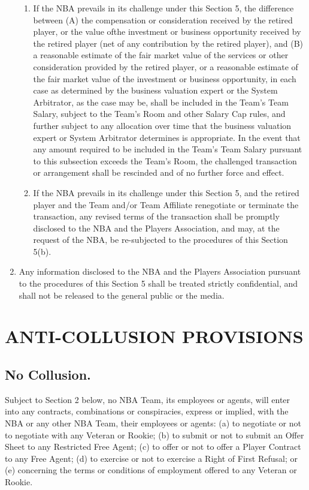 \documentclass[
]{book}
\begin{document}
\begin{enumerate}
\begin{enumerate}
  \item
    If the NBA prevails in its challenge under this Section 5, the difference between (A) the compensation or consideration received by the retired player, or the value ofthe investment or business opportunity received by the retired player (net of any contribution by the retired player), and (B) a reasonable estimate of the fair market value of the services or other consideration provided by the retired player, or a reasonable estimate of the fair market value of the investment or business opportunity, in each case as determined by the business valuation expert or the System Arbitrator, as the case may be, shall be included in the Team's Team Salary, subject to the Team's Room and other Salary Cap rules, and further subject to any allocation over time that the business valuation expert or System Arbitrator determines is appropriate. In the event that any amount required to be included in the Team's Team Salary pursuant to this subsection exceeds the Team's Room, the challenged transaction or arrangement shall be rescinded and of no further force and effect.
  \item
    If the NBA prevails in its challenge under this Section 5, and the retired player and the Team and/or Team Affiliate renegotiate or terminate the transaction, any revised terms of the transaction shall be promptly disclosed to the NBA and the Players Association, and may, at the request of the NBA, be re-subjected to the procedures of this Section 5(b).
  \end{enumerate}
\item
  Any information disclosed to the NBA and the Players Association pursuant to the procedures of this Section 5 shall be treated strictly confidential, and shall not be released to the general public or the media.
\end{enumerate}

\hypertarget{anti-collusion-provisions}{%
\chapter{ANTI-COLLUSION PROVISIONS}\label{anti-collusion-provisions}}

\hypertarget{no-collusion.}{%
\section{No Collusion.}\label{no-collusion.}}

Subject to Section 2 below, no NBA Team, its employees or agents, will enter into any contracts, combinations or conspiracies, express or implied, with the NBA or any other NBA Team, their employees or agents: (a) to negotiate or not to negotiate with any Veteran or Rookie; (b) to submit or not to submit an Offer Sheet to any Restricted Free Agent; (c) to offer or not to offer a Player Contract to any Free Agent; (d) to exercise or not to exercise a Right of First Refusal; or (e) concerning the terms or conditions of employment offered to any Veteran or Rookie.
\end{document}
